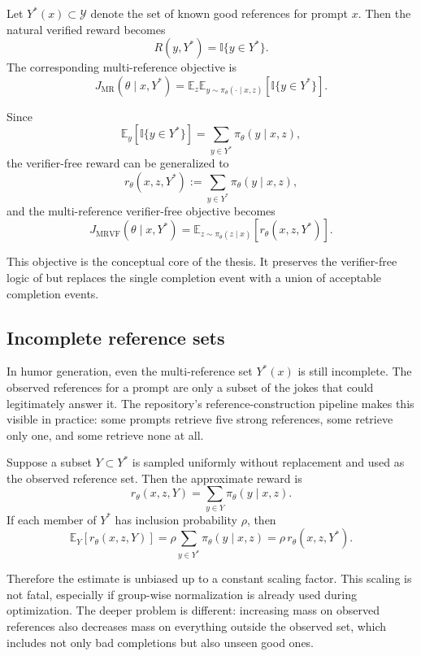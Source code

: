\documentclass[14pt,a4paper]{extreport}
\begin{document}
Let \(Y^{*}(x)\subset\mathcal{Y}\) denote the set of known good references for prompt \(x\). Then the natural verified reward becomes
\[
  R(y,Y^{*})=\mathbb{I}\{y\in Y^{*}\}.
\]
The corresponding multi-reference objective is
\[
  J_{\text{MR}}(\theta\mid x,Y^{*})
  =
  \mathbb{E}_{z}
  \mathbb{E}_{y\sim\pi_{\theta}(\cdot\mid x,z)}
    [\mathbb{I}\{y\in Y^{*}\}].
\]

Since
\[
  \mathbb{E}_{y}[\mathbb{I}\{y\in Y^{*}\}]
  =
  \sum_{y\in Y^{*}}\pi_{\theta}(y\mid x,z),
\]
the verifier-free reward can be generalized to
\[
  r_{\theta}(x,z,Y^{*})
  :=
  \sum_{y\in Y^{*}}\pi_{\theta}(y\mid x,z),
\]
and the multi-reference verifier-free objective becomes
\[
  J_{\text{MRVF}}(\theta\mid x,Y^{*})
  =
  \mathbb{E}_{z\sim\pi_{\theta}(z\mid x)}[r_{\theta}(x,z,Y^{*})].
\]

This objective is the conceptual core of the thesis. It preserves the verifier-free logic of \citet{Zhou2025} but replaces the single completion event with a union of acceptable completion events.

\subsection{Incomplete reference sets}

In humor generation, even the multi-reference set \(Y^{*}(x)\) is still incomplete. The observed references for a prompt are only a subset of the jokes that could legitimately answer it. The repository's reference-construction pipeline makes this visible in practice: some prompts retrieve five strong references, some retrieve only one, and some retrieve none at all.

Suppose a subset \(Y\subset Y^{*}\) is sampled uniformly without replacement and used as the observed reference set. Then the approximate reward is
\[
  r_{\theta}(x,z,Y)=\sum_{y\in Y}\pi_{\theta}(y\mid x,z).
\]
If each member of \(Y^{*}\) has inclusion probability \(\rho\), then
\[
  \mathbb{E}_{Y}[r_{\theta}(x,z,Y)]
  =
  \rho
  \sum_{y\in Y^{*}}\pi_{\theta}(y\mid x,z)
  =
  \rho\,r_{\theta}(x,z,Y^{*}).
\]

Therefore the estimate is unbiased up to a constant scaling factor. This scaling is not fatal, especially if group-wise normalization is already used during optimization. The deeper problem is different: increasing mass on observed references also decreases mass on everything outside the observed set, which includes not only bad completions but also unseen good ones.
\end{document}
